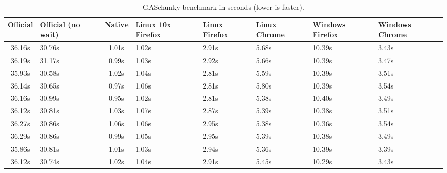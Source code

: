 \begin{table}[ht]
  \begin{tabular}{c p{1.5cm} c p{1.7cm} p{1.5cm} p{2cm} p{2cm} p{1.5cm}}
    \toprule
    Official & Official (no wait) & Native & Linux 10x Firefox & Linux Firefox & Linux Chrome  & Windows Firefox & Windows Chrome\\
    \midrule
    36.16s &             30.76s &  1.01s & 1.02s               & 2.91s         & 5.68s         & 10.39s           & 3.43s          \\
    36.19s &             31.17s &  0.99s & 1.03s               & 2.92s         & 5.66s         & 10.39s           & 3.47s          \\
    35.93s &             30.58s &  1.02s & 1.04s               & 2.81s         & 5.59s         & 10.39s           & 3.51s          \\
    36.14s &             30.65s &  0.97s & 1.06s               & 2.81s         & 5.80s         & 10.39s           & 3.54s          \\
    36.16s &             30.99s &  0.95s & 1.02s               & 2.81s         & 5.38s         & 10.40s           & 3.49s          \\
    36.12s &             30.81s &  1.03s & 1.07s               & 2.87s         & 5.39s         & 10.38s           & 3.51s          \\
    36.27s &             30.86s &  1.06s & 1.06s               & 2.95s         & 5.38s         & 10.36s           & 3.54s          \\
    36.29s &             30.86s &  0.99s & 1.05s               & 2.95s         & 5.39s         & 10.38s           & 3.49s          \\
    35.86s &             30.81s &  1.01s & 1.03s               & 2.94s         & 5.36s         & 10.39s           & 3.39s          \\
    36.12s &             30.74s &  1.02s & 1.04s               & 2.91s         & 5.45s         & 10.29s           & 3.43s          \\
    \bottomrule
  \end{tabular}
  \caption{GASchunky benchmark in seconds (lower is faster).}%
  \label{table:gaschunky}
\end{table}

